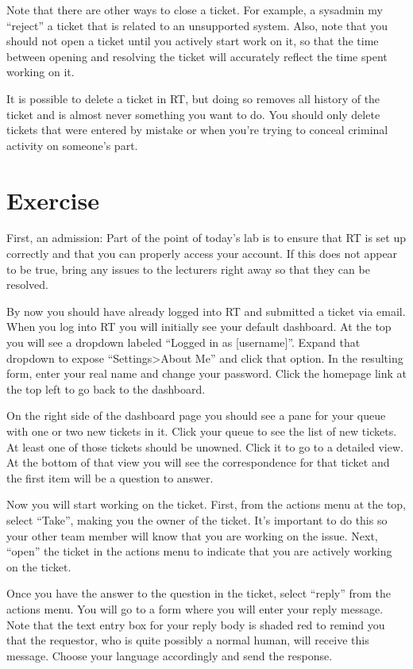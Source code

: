 \documentclass{article}
\begin{document}
Note that there are other ways to close a ticket. For example, a sysadmin my ``reject'' a ticket that is related to an unsupported system. Also, note that you should not open a ticket until you actively start work on it, so that the time between opening and resolving the ticket will accurately reflect the time spent working on it.

It is possible to delete a ticket in RT, but doing so removes all history of the ticket and is almost never something you want to do. You should only delete tickets that were entered by mistake or when you're trying to conceal criminal activity on someone's part.

\section{Exercise}
First, an admission: Part of the point of today's lab is to ensure that RT is set up correctly and that you can properly access your account. If this does not appear to be true, bring any issues to the lecturers right away so that they can be resolved.

By now you should have already logged into RT and submitted a ticket via email. When you log into RT you will initially see your default dashboard. At the top you will see a dropdown labeled ``Logged in as [username]''. Expand that dropdown to expose ``Settings>About Me'' and click that option. In the resulting form, enter your real name and change your password. Click the homepage link at the top left to go back to the dashboard.

On the right side of the dashboard page you should see a pane for your queue with one or two new tickets in it. Click your queue to see the list of new tickets. At least one of those tickets should be unowned. Click it to go to a detailed view. At the bottom of that view you will see the correspondence for that ticket and the first item will be a question to answer.

Now you will start working on the ticket. First, from the actions menu at the top, select ``Take'', making you the owner of the ticket. It's important to do this so your other team member will know that you are working on the issue. Next, ``open'' the ticket in the actions menu to indicate that you are actively working on the ticket.

Once you have the answer to the question in the ticket, select ``reply'' from the actions menu. You will go to a form where you will enter your reply message. Note that the text entry box for your reply body is shaded red to remind you that the requestor, who is quite possibly a normal human, will receive this message. Choose your language accordingly and send the response.
\end{document}
